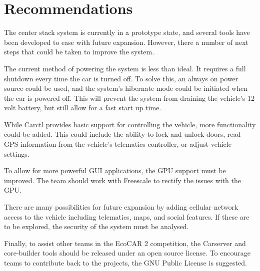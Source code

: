 \documentclass[ece]{uw-wkrpt}
\begin{document}
\section{Recommendations}

The center stack system is currently in a prototype state, and several tools
have been developed to ease with future expansion. However, there a number of
next steps that could be taken to improve the system.

The current method of powering the system is less than ideal. It requires a full
shutdown every time the car is turned off. To solve this, an always on power
source could be used, and the system's hibernate mode could be initiated when
the car is powered off. This will prevent the system from draining the vehicle's
12 volt battery, but still allow for a fast start up time.

While Carctl provides basic support for controlling the vehicle, more
functionality could be added. This could include the ability to lock and unlock
doors, read GPS information from the vehicle's telematics controller, or adjust
vehicle settings.

To allow for more powerful GUI applications, the GPU support must be improved.
The team should work with Freescale to rectify the issues with the GPU.

There are many possibilities for future expansion by adding cellular network
access to the vehicle including telematics, maps, and social features. If these 
are to be explored, the security of the system must be analysed.

Finally, to assist other teams in the EcoCAR 2 competition, the Carserver and
core-builder tools should be released under an open source license. To encourage
teams to contribute back to the projects, the GNU Public License is suggested.

\backmatter

%

\end{document}
